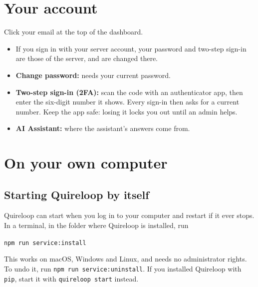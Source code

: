 \documentclass[11pt]{article}
\begin{document}
\section{Your account}\label{sec:account}

Click your email at the top of the dashboard.
\begin{itemize}
  \item If you sign in with your server account, your password and two-step
    sign-in are those of the server, and are changed there.
  \item \textbf{Change password:} needs your current password.
  \item \textbf{Two-step sign-in (2FA):} scan the code with an authenticator
    app, then enter the six-digit number it shows. Every sign-in then asks for a
    current number. Keep the app safe: losing it locks you out until an admin
    helps.
  \item \textbf{AI Assistant:} where the assistant's answers come from.
\end{itemize}

\section{On your own computer}

\subsection{Starting Quireloop by itself}
Quireloop can start when you log in to your computer and restart if it ever
stops. In a terminal, in the folder where Quireloop is installed, run
\begin{center}\texttt{npm run service:install}\end{center}
This works on macOS, Windows and Linux, and needs no administrator rights.
To undo it, run \texttt{npm run service:uninstall}. If you installed Quireloop
with \texttt{pip}, start it with \texttt{quireloop start} instead.
\end{document}
